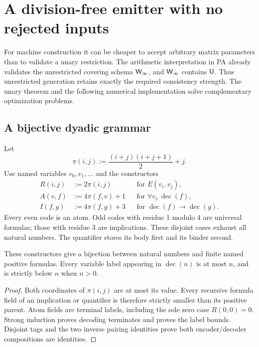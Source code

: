 \section{A division-free emitter with no rejected inputs}
\label{sec:emitter}

For machine construction it can be cheaper to accept arbitrary matrix parameters than to validate a unary restriction. The arithmetic interpretation in PA already validates the unrestricted covering schema $\mathsf{W}_{\infty}$, and $\mathsf{W}_{\infty}$ contains $\mathsf{U}$. Thus unrestricted generation retains exactly the required consistency strength. The unary theorem and the following numerical implementation solve complementary optimization problems.

\subsection{A bijective dyadic grammar}

Let
\[
 \pi(i,j):=\frac{(i+j)(i+j+1)}2+j.
\]
Use named variables $v_0,v_1,\ldots$ and the constructors
\begin{align*}
 R(i,j)&:=2\pi(i,j) &&\text{for }E(v_i,v_j),\\
 A(v,f)&:=4\pi(f,v)+1 &&\text{for }\forall v_v\,\operatorname{dec}(f),\\
 I(f,g)&:=4\pi(f,g)+3 &&\text{for }\operatorname{dec}(f)\to\operatorname{dec}(g).
\end{align*}
Every even code is an atom. Odd codes with residue 1 modulo 4 are universal formulas; those with residue 3 are implications. These disjoint cases exhaust all natural numbers. The quantifier stores its body first and its binder second.

\begin{lemma}\label{lem:codec}
These constructors give a bijection between natural numbers and finite named positive formulas. Every variable label appearing in $\operatorname{dec}(n)$ is at most $n$, and is strictly below $n$ when $n>0$.
\end{lemma}
\begin{proof}
Both coordinates of $\pi(i,j)$ are at most its value. Every recursive formula field of an implication or quantifier is therefore strictly smaller than its positive parent. Atom fields are terminal labels, including the sole zero case $R(0,0)=0$. Strong induction proves decoding terminates and proves the label bounds. Disjoint tags and the two inverse pairing identities prove both encoder/decoder compositions are identities.
\end{proof}

